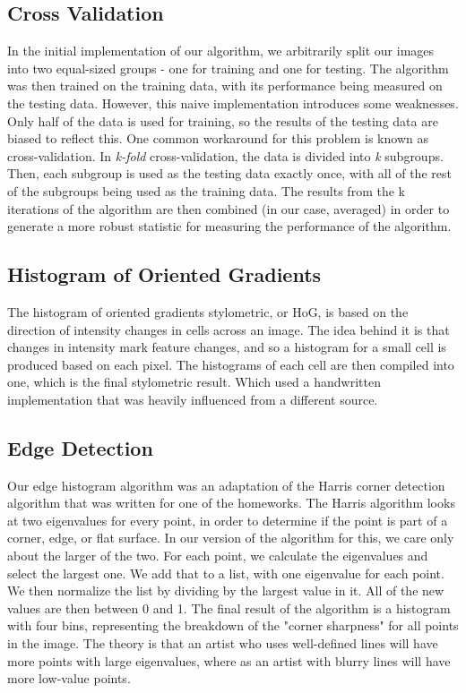 \documentclass{article}
\begin{document}
  \subsection{Cross Validation}
  In the initial implementation of our algorithm, we arbitrarily split our
  images into two equal-sized groups - one for training and one for testing. The
  algorithm was then trained on the training data, with its performance being
  measured on the testing data. However, this naive implementation introduces
  some weaknesses. Only half of the data is used for training, so the results of
  the testing data are biased to reflect this. One common workaround for this
  problem is known as cross-validation. In \emph{k-fold} cross-validation, the
  data is divided into \emph{k} subgroups. Then, each subgroup is used as the
  testing data exactly once, with all of the rest of the subgroups being used as
  the training data. The results from the k iterations of the algorithm are then
  combined (in our case, averaged) in order to generate a more robust statistic
  for measuring the performance of the algorithm.

  \subsection{Histogram of Oriented Gradients}
  The histogram of oriented gradients stylometric, or HoG, is based on the
  direction of intensity changes in cells across an image. The idea behind it is
  that changes in intensity mark feature changes, and so a histogram for a small
  cell is produced based on each pixel. The histograms of each cell are then
  compiled into one, which is the final stylometric result. Which used a
  handwritten implementation that was heavily influenced from a different
  source.

  \subsection{Edge Detection}
  Our edge histogram algorithm was an adaptation of the Harris corner detection
  algorithm that was written for one of the homeworks. The Harris algorithm
  looks at two eigenvalues for every point, in order to determine if the point
  is part of a corner, edge, or flat surface. In our version of the algorithm
  for this, we care only about the larger of the two. For each point, we
  calculate the eigenvalues and select the largest one. We add that to a list,
  with one eigenvalue for each point. We then normalize the list by dividing by
  the largest value in it. All of the new values are then between 0 and 1. The
  final result of the algorithm is a histogram with four bins, representing the
  breakdown of the "corner sharpness" for all points in the image. The theory is
  that an artist who uses well-defined lines will have more points with large
  eigenvalues, where as an artist with blurry lines will have more low-value
  points. 
\end{document}

